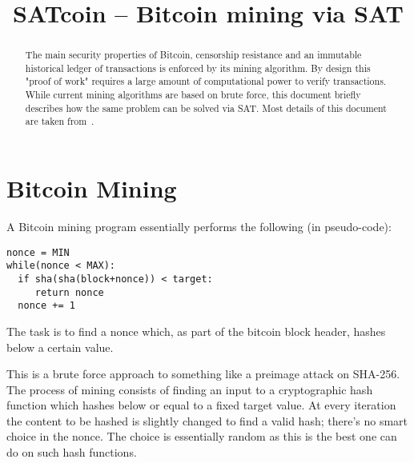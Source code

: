\documentclass[conference]{IEEEtran}
\begin{document}
	
\title{SATcoin -- Bitcoin mining via SAT}

\author{
\and
{}
}

\maketitle

\def\minisat{\textsc{Minisat~2.2}\xspace}
\def\cbmc{\textsc{CBMC}\xspace}

\begin{abstract}
The main security properties of Bitcoin, censorship resistance and an immutable historical ledger of transactions is enforced by its mining algorithm.
By design this "proof of work" requires a large amount of computational power to verify transactions.
While current mining algorithms are based on brute force, this document briefly describes how the same problem can be solved via SAT.
Most details of this document are taken from~\cite{satcoin-online-article}.
\end{abstract}

\section{Bitcoin Mining}

A Bitcoin mining program essentially performs the following (in pseudo-code):

\begin{verbatim}
nonce = MIN
while(nonce < MAX):
  if sha(sha(block+nonce)) < target:
     return nonce
  nonce += 1
\end{verbatim}

The task is to find a nonce which, as part of the bitcoin block header, hashes below a certain value.

This is a brute force approach to something like a preimage attack on SHA-256.
The process of mining consists of finding an input to a cryptographic hash function which hashes below or equal to a fixed target value.
At every iteration the content to be hashed is slightly changed to find a valid hash; there's no smart choice in the nonce.
The choice is essentially random as this is the best one can do on such hash functions.
\end{document}
